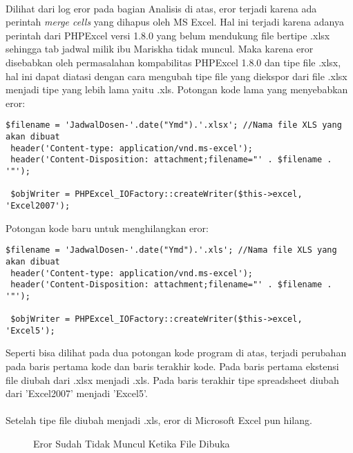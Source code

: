 \paragraph{}Dilihat dari log eror pada bagian Analisis di atas, eror terjadi karena ada perintah \textit{merge cells} yang dihapus oleh MS Excel. Hal ini terjadi karena adanya perintah dari PHPExcel versi 1.8.0 yang belum mendukung file bertipe .xlsx sehingga tab jadwal milik ibu Mariskha tidak muncul. Maka karena eror disebabkan oleh permasalahan kompabilitas PHPExcel 1.8.0 dan tipe file .xlsx,  hal ini dapat diatasi dengan cara mengubah tipe file yang diekspor dari file .xlsx menjadi tipe yang lebih lama yaitu .xls.
\newline
\newline
Potongan kode lama yang menyebabkan eror:
\begin{lstlisting}[caption={Kode Lama},captionpos=b]
 $filename = 'JadwalDosen-'.date("Ymd").'.xlsx'; //Nama file XLS yang akan dibuat
 header('Content-type: application/vnd.ms-excel');
 header('Content-Disposition: attachment;filename="' . $filename . '"');

 $objWriter = PHPExcel_IOFactory::createWriter($this->excel, 'Excel2007');
\end{lstlisting}
Potongan kode baru untuk menghilangkan eror:
\begin{lstlisting}[caption={Kode Baru},captionpos=b]
 $filename = 'JadwalDosen-'.date("Ymd").'.xls'; //Nama file XLS yang akan dibuat
 header('Content-type: application/vnd.ms-excel');
 header('Content-Disposition: attachment;filename="' . $filename . '"');

 $objWriter = PHPExcel_IOFactory::createWriter($this->excel, 'Excel5');
\end{lstlisting}
Seperti bisa dilihat pada dua potongan kode program di atas, terjadi perubahan pada baris pertama kode dan baris terakhir kode. Pada baris pertama ekstensi file diubah dari .xlsx menjadi .xls. Pada baris terakhir tipe spreadsheet diubah dari 'Excel2007' menjadi 'Excel5'.
\paragraph{}Setelah tipe file diubah menjadi  .xls, eror di Microsoft Excel pun hilang.
\begin{figure} [H]
	\centering  
	\caption[Eror Sudah Tidak Muncul Ketika File Dibuka]{Eror Sudah Tidak Muncul Ketika File Dibuka} 
	\label{fig:eror-hilang} 
\end{figure}

